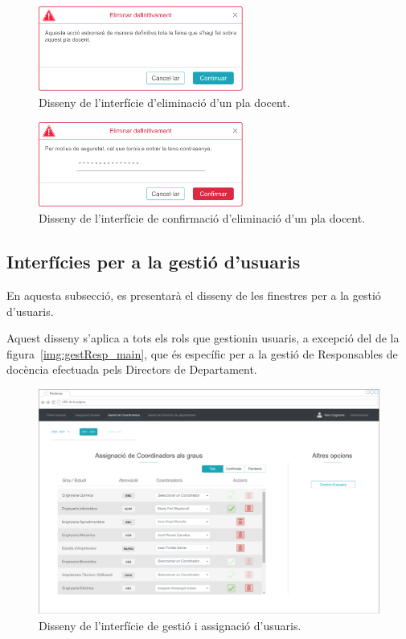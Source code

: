 \documentclass[a4paper,12pt]{ThesisStyle}
\begin{document}
\begin{figure}[H]
	\centering
	\includegraphics[width=0.6\textwidth]{assets/interfaces/administradors/plansDocents/esborrarBox.pdf}
	\caption{\label{img:plansDocents_esborrarBox}Disseny de l'interfície d'eliminació d'un pla docent.}
\end{figure}

\begin{figure}[H]
	\centering
	\includegraphics[width=0.6\textwidth]{assets/interfaces/administradors/plansDocents/confirmarEsborrarBox.pdf}
	\caption{\label{img:plansDocents_confirmarEsborrarBox}Disseny de l'interfície de confirmació d'eliminació d'un pla docent.}
\end{figure}

\subsection{Interfícies per a la gestió d'usuaris}
\label{subsec:interficies_gestio_usuaris}

En aquesta subsecció, es presentarà el disseny de les finestres per a la gestió d'usuaris.

Aquest disseny s'aplica a tots els rols que gestionin usuaris, a excepció del de la figura~\ref{img:gestResp_main}, que és específic per a la gestió de Responsables de docència efectuada pels Directors de Departament.

\begin{figure}[H]
	\centering
	\includegraphics[width=\textwidth]{assets/interfaces/administradors/gestCoords/main.pdf}
	\caption{\label{img:gestCoords_main}Disseny de l'interfície de gestió i assignació d'usuaris.}
\end{figure}
\end{document}
